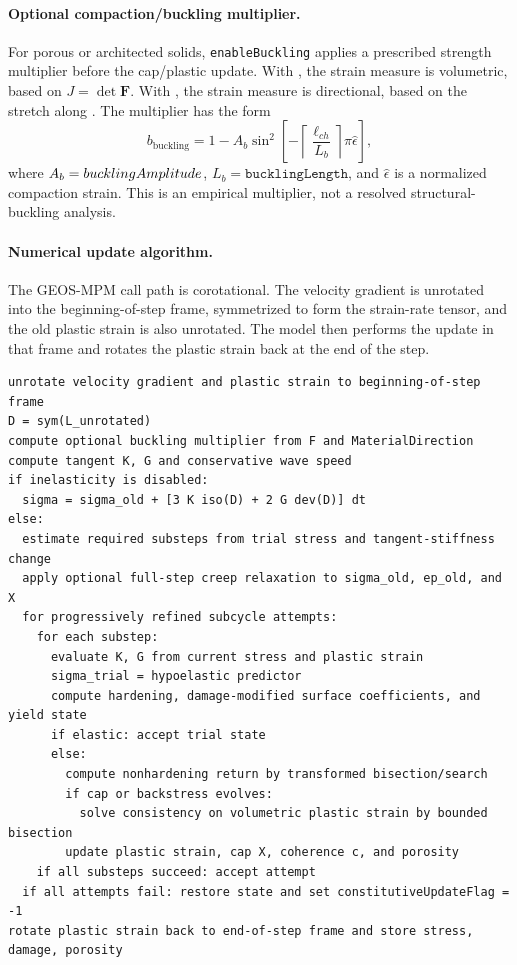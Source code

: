 \paragraph{Optional compaction/buckling multiplier.}
For porous or architected solids, \texttt{enableBuckling} applies a prescribed strength multiplier before the cap/plastic update.  With , the strain measure is volumetric, based on \(J=\det\mathbf{F}\).  With , the strain measure is directional, based on the stretch along .  The multiplier has the form
\begin{equation}
  b_{\mathrm{buckling}} = 1-A_b\sin^2\left[-\left\lceil\frac{\ell_{ch}}{L_b}\right\rceil\pi\hat\epsilon\right],
  \label{eq:geomechanics-buckling}
\end{equation}
where \(A_b=bucklingAmplitude\), \(L_b=\texttt{bucklingLength}\), and \(\hat\epsilon\) is a normalized compaction strain.  This is an empirical multiplier, not a resolved structural-buckling analysis.

\paragraph{Numerical update algorithm.}
The GEOS-MPM call path is corotational.  The velocity gradient is unrotated into the beginning-of-step frame, symmetrized to form the strain-rate tensor, and the old plastic strain is also unrotated.  The model then performs the update in that frame and rotates the plastic strain back at the end of the step.

\begin{lstlisting}[caption={Geomechanics update structure.},label={alg:geomechanics-update},basicstyle=\ttfamily\small]
unrotate velocity gradient and plastic strain to beginning-of-step frame
D = sym(L_unrotated)
compute optional buckling multiplier from F and MaterialDirection
compute tangent K, G and conservative wave speed
if inelasticity is disabled:
  sigma = sigma_old + [3 K iso(D) + 2 G dev(D)] dt
else:
  estimate required substeps from trial stress and tangent-stiffness change
  apply optional full-step creep relaxation to sigma_old, ep_old, and X
  for progressively refined subcycle attempts:
    for each substep:
      evaluate K, G from current stress and plastic strain
      sigma_trial = hypoelastic predictor
      compute hardening, damage-modified surface coefficients, and yield state
      if elastic: accept trial state
      else:
        compute nonhardening return by transformed bisection/search
        if cap or backstress evolves:
          solve consistency on volumetric plastic strain by bounded bisection
        update plastic strain, cap X, coherence c, and porosity
    if all substeps succeed: accept attempt
  if all attempts fail: restore state and set constitutiveUpdateFlag = -1
rotate plastic strain back to end-of-step frame and store stress, damage, porosity
\end{lstlisting}

